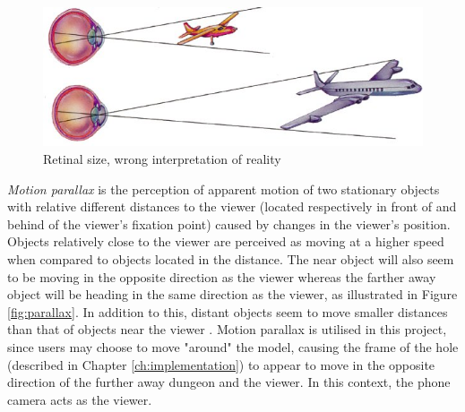 \begin{figure}[h!]
   \centering
   \includegraphics[scale=1]{figures/cue7.jpg}
   \caption{Retinal size, wrong interpretation of reality \cite{Psych}}\label{fig:cue7}
\end{figure}\pagebreak

\textit{Motion parallax} is the perception of apparent motion of two stationary objects with relative different distances to the viewer (located respectively in front of and behind of the viewer’s fixation point) caused by changes in the viewer’s position. Objects relatively close to the viewer are perceived as moving at a higher speed when compared to objects located in the distance. The near object will also seem to be moving in the opposite direction as the viewer whereas the farther away object will be heading in the same direction as the viewer, as illustrated in Figure \ref{fig:parallax}. In addition to this, distant objects seem to move smaller distances than that of objects near the viewer \cite{Gale} \cite{Shrestha2013} \cite{Skybrary}. Motion parallax is utilised in this project, since users may choose to move "around" the model, causing the frame of the hole (described in Chapter \ref{ch:implementation}) to appear to move in the opposite direction of the further away dungeon and the viewer. In this context, the phone camera acts as the viewer.

